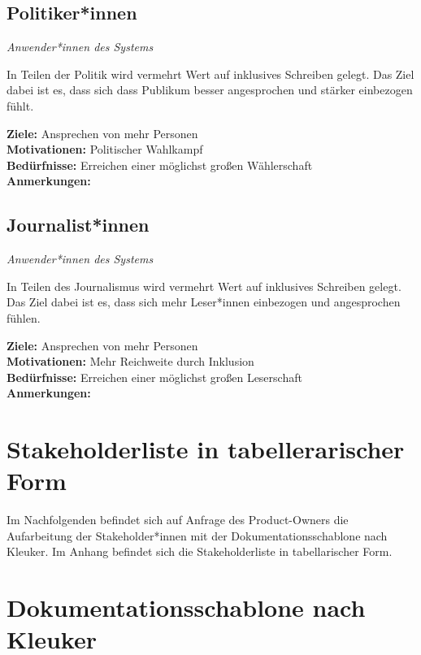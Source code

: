 \documentclass[paper=a4, parskip=half]{scrreprt}
\begin{document}
\subsection{Politiker*innen}
\vspace{-0.5cm}\textit{Anwender*innen des Systems}

In Teilen der Politik wird vermehrt Wert auf inklusives Schreiben gelegt.
Das Ziel dabei ist es, dass sich dass Publikum besser angesprochen und stärker einbezogen fühlt.

\textbf{Ziele:} Ansprechen von mehr Personen\\
\textbf{Motivationen:} Politischer Wahlkampf \\
\textbf{Bedürfnisse:} Erreichen einer möglichst großen Wählerschaft\\
\textbf{Anmerkungen:}\\

\subsection{Journalist*innen}
\vspace{-0.5cm}\textit{Anwender*innen des Systems}

In Teilen des Journalismus wird vermehrt Wert auf inklusives Schreiben gelegt.
Das Ziel dabei ist es, dass sich mehr Leser*innen einbezogen und angesprochen fühlen.

\textbf{Ziele:} Ansprechen von mehr Personen\\
\textbf{Motivationen:} Mehr Reichweite durch Inklusion \\
\textbf{Bedürfnisse:} Erreichen einer möglichst großen Leserschaft\\
\textbf{Anmerkungen:}\\

\section{Stakeholderliste in tabellerarischer Form}
Im Nachfolgenden befindet sich auf Anfrage des Product-Owners die Aufarbeitung der Stakeholder*innen mit der Dokumentationsschablone nach Kleuker. Im Anhang befindet sich die Stakeholderliste in tabellarischer Form.


\section{Dokumentationsschablone nach Kleuker}
\end{document}
